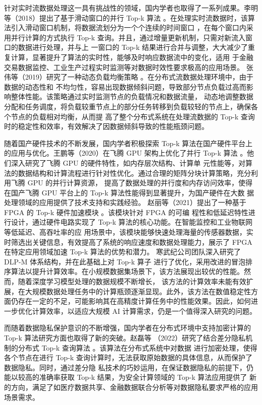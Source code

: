 针对实时流数据处理这一具有挑战性的领域，国内学者也取得了一系列成果。李明等（2018）提出了基于滑动窗口的并行 Top-k
 算法 \cite {li2018}。在处理实时流数据时，该算法引入滑动窗口机制，将数据流划分为一个个连续的时间窗口
 ，在每个窗口内采用并行计算的方式执行 Top-k 查询。并且，通过增量更新机制，只需对新流入窗口的数据进行处理，并与上
 一窗口的 Top-k 结果进行合并与调整，大大减少了重复计算，显著提升了算法的实时性，能够及时响应数据流中的变化，适用
 于金融交易数据监控、工业生产过程实时监测等对数据时效性要求极高的应用场景。
张伟等（2019）研究了一种动态负载均衡策略 \cite {zhang2019}。在分布式流数据处理环境中，由于数据的动态性和
不均匀性，容易出现数据倾斜问题，导致部分节点负载过高而影响整体性能。该策略通过实时监测节点的负载情况和数据流量，
动态地调整数据分配和任务调度，将负载较重节点上的部分任务转移到负载较轻的节点上，确保各个节点的负载相对均衡，从而提
高了整个分布式系统在处理流数据的 Top-k 查询时的稳定性和效率，有效解决了因数据倾斜导致的性能瓶颈问题。

随着国产硬件技术的不断发展，国内学者积极探索 Top-k 算法在国产硬件平台上的应用与优化。王鹏等（2020）在飞腾 GPU 
架构上优化了并行 Top-k 算法 \cite {wang2020}。他们深入研究了飞腾 GPU 的硬件特性，如内存层次结构、计算单
元性能等，对算法的数据结构和计算流程进行针对性优化。通过合理的矩阵分块计算策略，充分利用飞腾 GPU 的并行计算资源，
提高了数据处理的并行度和内存访问效率，使得在国产飞腾 GPU 平台上的 Top-k 算法性能得到显著提升，为国产硬件在大数
据处理领域的应用提供了技术支持和实践经验。
赵丽等（2021）提出了一种基于 FPGA 的 Top-k 硬件加速模块 \cite {Zhao2021}。该模块针对 FPGA 的可编
程性和低延迟特性进行设计，通过硬件电路实现了 Top-k 算法的核心功能。在智能监控和工业物联网等低延迟、高吞吐率的应
用场景中，该模块能够快速处理海量的传感器数据，实时筛选出关键信息，有效提高了系统的响应速度和数据处理能力，展示了 
FPGA 在特定应用领域加速 Top-k 算法的优势和潜力。
寒武纪公司团队深入研究了 DLP-M 体系结构，并在此基础上对 Top-k 算子 进行了优化，采用改进的冒泡排序算法以提升计算效率。在小规模数据集场景下，该方法展现出较优的性能。然而，随着深度学习模型处理的数据规模不断增长，
该方法的计算效率未能有效扩展，在大规模数据处理任务中的计算瓶颈逐渐显现。此外，该方法在数值稳定性方面仍存在一定的不足，可能影响其在高精度计算任务中的性能效果。因此，如何进一步优化计算效率，以适应大规模 AI 计算需求，仍是一个值得深入研究的问题。

而随着数据隐私保护意识的不断增强，国内学者在分布式环境中支持加密计算的 Top-k 算法研究方面也取得了新的突破。赵磊等
（2022）研究了结合差分隐私机制的分布式 Top-k 查询算法 \cite {zhao2022}。该算法在分布式系统中对数据
进行加密处理，使得各个节点在进行 Top-k 查询计算时，无法获取原始数据的具体信息，从而保护了数据隐私。同时，通过差分隐
私技术的巧妙运用，在保证数据隐私的前提下，仍能以较高的准确率获取 Top-k 结果，为安全计算领域的 Top-k 算法应用提供了
新的方向，满足了如医疗数据共享、金融数据联合分析等对数据隐私要求严格的应用场景需求。

